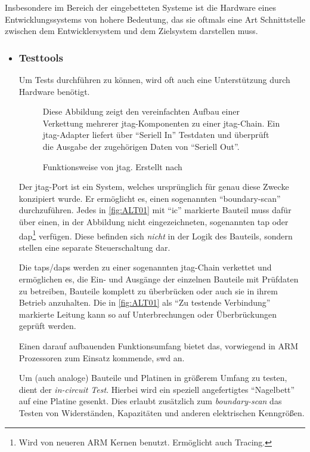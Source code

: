 Insbesondere im Bereich der eingebetteten Systeme ist die Hardware eines
Entwicklungssystems von hohere Bedeutung, das sie oftmals eine Art Schnittstelle
zwischen dem Entwicklersystem und dem Zielsystem darstellen muss.
\begin{itemize}
  \item \subsubsection*{Testtools} Um Tests durchführen zu können, wird
  oft auch eine Unterstützung durch Hardware benötigt. 
  \begin{figure}[!ht]
    \centering
    \def\svgwidth{\columnwidth}
    
    \caption{Funktionsweise von \gls{jtag}. Erstellt nach \cite{ALT01}}{Diese
    Abbildung zeigt den vereinfachten Aufbau einer Verkettung
    mehrerer \gls{jtag}-Komponenten zu einer \gls{jtag}-Chain. Ein
    \gls{jtag}-Adapter liefert über "`Seriell In"' Testdaten und überprüft die
    Ausgabe der zugehörigen Daten von "`Seriell Out"'. }
    \label{fig:ALT01}
  \end{figure}
  Der \gls{jtag}-Port ist ein System, welches ursprünglich für genau diese
  Zwecke konzipiert wurde. Er ermöglicht es, einen sogenannten "`boundary-scan"'
  durchzuführen. Jedes in \autoref{fig:ALT01} mit "`\gls{ic}"' markierte
  Bauteil muss dafür über einen, in der Abbildung nicht eingezeichneten, sogenannten \gls{tap} oder
  \gls{dap}\footnote{Wird von neueren ARM Kernen benutzt.
  Ermöglicht auch Tracing.} verfügen. Diese befinden sich \emph{nicht} in der
  Logik des Bauteils, sondern stellen eine separate Steuerschaltung dar.
  
  Die \glspl{tap}/\glspl{dap} werden zu einer sogenannten
  \gls{jtag}-Chain verkettet und ermöglichen es, die Ein- und Ausgänge der
  einzelnen Bauteile mit Prüfdaten zu betreiben, Bauteile komplett zu überbrücken oder auch sie in ihrem Betrieb anzuhalten.
  Die in \autoref{fig:ALT01} als "`Zu testende Verbindung"' markierte Leitung
  kann so auf Unterbrechungen oder Überbrückungen geprüft werden.
  
  Einen darauf aufbauenden Funktionsumfang bietet das, vorwiegend in ARM
  Prozessoren zum Einsatz kommende, \gls{swd} an.
  
  Um (auch analoge) Bauteile und Platinen in größerem Umfang zu testen, dient
  der \emph{in-circuit Test}. Hierbei wird ein speziell angefertigtes
  "`Nagelbett"' auf eine Platine gesenkt. Dies erlaubt zusätzlich zum
  \emph{boundary-scan} das Testen von Widerständen, Kapazitäten und anderen
  elektrischen Kenngrößen.
   

\end{itemize}
